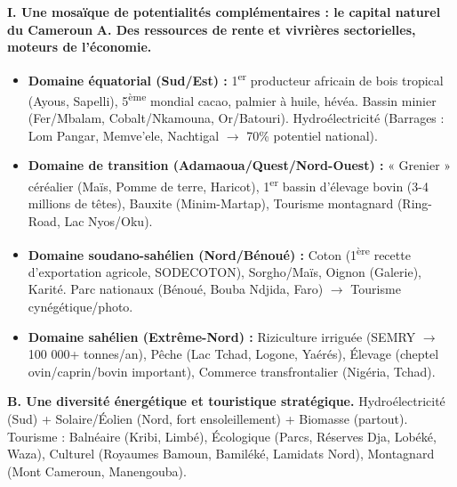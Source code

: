 \documentclass[11pt]{article}
\begin{document}
\begin{exoresolu}
\textbf{I. Une mosaïque de potentialités complémentaires : le capital naturel du Cameroun}
\textbf{A. Des ressources de rente et vivrières sectorielles, moteurs de l'économie.}
\begin{itemize}
    \item \textbf{Domaine équatorial (Sud/Est) :} 1\textsuperscript{er} producteur africain de bois tropical (Ayous, Sapelli), 5\textsuperscript{ème} mondial cacao, palmier à huile, hévéa. Bassin minier (Fer/Mbalam, Cobalt/Nkamouna, Or/Batouri). Hydroélectricité (Barrages : Lom Pangar, Memve'ele, Nachtigal $\rightarrow$ 70\% potentiel national).
    \item \textbf{Domaine de transition (Adamaoua/Quest/Nord-Ouest) :} « Grenier » céréalier (Maïs, Pomme de terre, Haricot), 1\textsuperscript{er} bassin d'élevage bovin (3-4 millions de têtes), Bauxite (Minim-Martap), Tourisme montagnard (Ring-Road, Lac Nyos/Oku).
    \item \textbf{Domaine soudano-sahélien (Nord/Bénoué) :} Coton (1\textsuperscript{ère} recette d'exportation agricole, SODECOTON), Sorgho/Maïs, Oignon (Galerie), Karité. Parc nationaux (Bénoué, Bouba Ndjida, Faro) $\rightarrow$ Tourisme cynégétique/photo.
    \item \textbf{Domaine sahélien (Extrême-Nord) :} Riziculture irriguée (SEMRY $\rightarrow$ 100 000+ tonnes/an), Pêche (Lac Tchad, Logone, Yaérés), Élevage (cheptel ovin/caprin/bovin important), Commerce transfrontalier (Nigéria, Tchad).
\end{itemize}
\textbf{B. Une diversité énergétique et touristique stratégique.}
Hydroélectricité (Sud) + Solaire/Éolien (Nord, fort ensoleillement) + Biomasse (partout). Tourisme : Balnéaire (Kribi, Limbé), Écologique (Parcs, Réserves Dja, Lobéké, Waza), Culturel (Royaumes Bamoun, Bamiléké, Lamidats Nord), Montagnard (Mont Cameroun, Manengouba).


\end{exoresolu}
\end{document}
